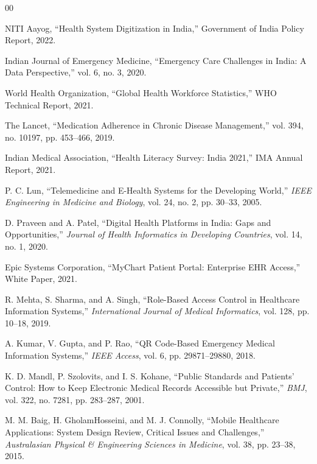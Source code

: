 \begin{thebibliography}{00}

NITI Aayog, ``Health System Digitization in India,'' Government of India Policy Report, 2022.

Indian Journal of Emergency Medicine, ``Emergency Care Challenges in India: A Data Perspective,'' vol. 6, no. 3, 2020.

World Health Organization, ``Global Health Workforce Statistics,'' WHO Technical Report, 2021.

The Lancet, ``Medication Adherence in Chronic Disease Management,'' vol. 394, no. 10197, pp. 453--466, 2019.

Indian Medical Association, ``Health Literacy Survey: India 2021,'' IMA Annual Report, 2021.

P. C. Lun, ``Telemedicine and E-Health Systems for the Developing World,'' \textit{IEEE Engineering in Medicine and Biology}, vol. 24, no. 2, pp. 30--33, 2005.

D. Praveen and A. Patel, ``Digital Health Platforms in India: Gaps and Opportunities,'' \textit{Journal of Health Informatics in Developing Countries}, vol. 14, no. 1, 2020.

Epic Systems Corporation, ``MyChart Patient Portal: Enterprise EHR Access,'' White Paper, 2021.

R. Mehta, S. Sharma, and A. Singh, ``Role-Based Access Control in Healthcare Information Systems,'' \textit{International Journal of Medical Informatics}, vol. 128, pp. 10--18, 2019.

A. Kumar, V. Gupta, and P. Rao, ``QR Code-Based Emergency Medical Information Systems,'' \textit{IEEE Access}, vol. 6, pp. 29871--29880, 2018.

K. D. Mandl, P. Szolovits, and I. S. Kohane, ``Public Standards and Patients' Control: How to Keep Electronic Medical Records Accessible but Private,'' \textit{BMJ}, vol. 322, no. 7281, pp. 283--287, 2001.

M. M. Baig, H. GholamHosseini, and M. J. Connolly, ``Mobile Healthcare Applications: System Design Review, Critical Issues and Challenges,'' \textit{Australasian Physical \& Engineering Sciences in Medicine}, vol. 38, pp. 23--38, 2015.

\end{thebibliography}


